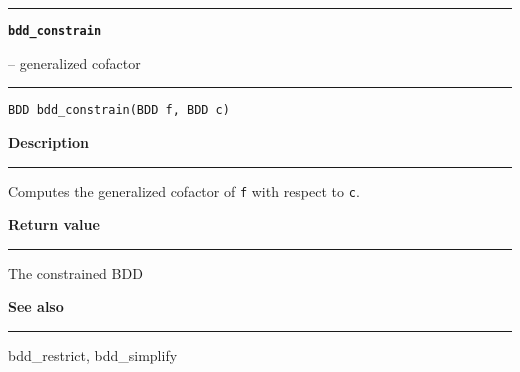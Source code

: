 \begin{minipage}{\textwidth}

\noindent\begin{minipage}{\textwidth}
\rule{\textwidth}{0.5mm}
{\tt\bf bdd\_constrain }
\--- generalized cofactor  \hspace{\fill}
\\\rule[1.5ex]{\textwidth}{0.5mm}
\end{minipage}

\noindent\begin{verbatim}
BDD bdd_constrain(BDD f, BDD c) 
\end{verbatim}

\vspace{\parsep}\noindent
{\bf Description}\\\rule[1.5ex]{\textwidth}{0.2mm}\vspace{-1.5ex}\setlength{\parindent}{1em}
Computes the generalized cofactor of {\tt f} with respect to
           {\tt c}. 

\setlength{\parindent}{0em}\vspace{\parsep}\vspace{\baselineskip}\noindent
{\bf Return value}\\\rule[1.5ex]{\textwidth}{0.2mm}\vspace{-1.5ex}
The constrained BDD 

\vspace{\parsep}\vspace{\baselineskip}\noindent
{\bf See also}\\\rule[1.5ex]{\textwidth}{0.2mm}\vspace{-1.5ex}
bdd\_restrict, bdd\_simplify 
\end{minipage}
\vspace{8ex}
